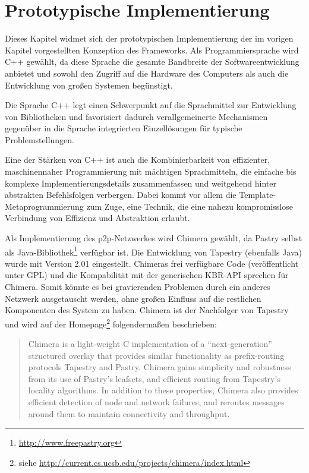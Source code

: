\chapter{Prototypische Implementierung}
\label{chap:impl}
Dieses Kapitel widmet sich der prototypischen Implementierung der im vorigen Kapitel vorgestellten Konzeption des Frameworks. Als Programmiersprache wird C++ gewählt, da diese Sprache die gesamte Bandbreite der Softwareentwicklung anbietet und sowohl den Zugriff auf die Hardware des Computers als auch die Entwicklung von großen Systemen begünstigt. 

Die Sprache C++ legt einen Schwerpunkt auf die Sprachmittel zur Entwicklung von Bibliotheken und favorisiert dadurch verallgemeinerte Mechanismen gegenüber in die Sprache integrierten Einzellösungen für typische Problemstellungen.

Eine der Stärken von C++ ist auch die Kombinierbarkeit von effizienter, maschinennaher Programmierung mit mächtigen Sprachmitteln, die einfache bis komplexe Implementierungsdetails zusammenfassen und weitgehend hinter abstrakten Befehlsfolgen verbergen. Dabei kommt vor allem die Template-Metaprogrammierung zum Zuge, eine Technik, die eine nahezu kompromisslose Verbindung von Effizienz und Abstraktion erlaubt.

Als Implementierung des p2p-Netzwerkes wird Chimera \cite{Allen2006Chimera} gewählt, da Pastry selbst als Java-Bibliothek\footnote{\url{http://www.freepastry.org}} verfügbar ist. Die Entwicklung von Tapestry (ebenfalls Java) wurde mit Version 2.01 eingestellt. Chimeras frei verfügbare Code (veröffentlicht unter GPL) und die Kompabilität mit der generischen KBR-API sprechen für Chimera. Somit könnte es bei gravierenden Problemen durch ein anderes Netzwerk ausgetauscht werden, ohne großen Einfluss auf die restlichen Komponenten des System zu haben. Chimera ist der Nachfolger von Tapestry und wird auf der Homepage\footnote{siehe \url{http://current.cs.ucsb.edu/projects/chimera/index.html}} folgendermaßen beschrieben: 
\begin{quote}
Chimera is a light-weight C implementation of a \enquote{next-generation} structured overlay that provides similar functionality as prefix-routing protocols Tapestry and Pastry.  Chimera gains simplicity and robustness from its use of Pastry's leafsets, and efficient routing from Tapestry's locality algorithms.  In addition to these properties, Chimera also provides efficient detection of node and network failures, and reroutes messages around them to maintain connectivity and throughput.  
\end{quote}

